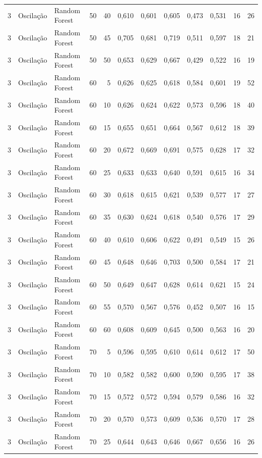 \begin{longtable}{@{}rllrrrrrrrrr@{}}
3 & Oscilação & Random Forest & 50 & 40 & 0,610 & 0,601 & 0,605 & 0,473 & 0,531 & 16 & 26 \\
3 & Oscilação & Random Forest & 50 & 45 & 0,705 & 0,681 & 0,719 & 0,511 & 0,597 & 18 & 21 \\
3 & Oscilação & Random Forest & 50 & 50 & 0,653 & 0,629 & 0,667 & 0,429 & 0,522 & 16 & 19 \\
3 & Oscilação & Random Forest & 60 & 5 & 0,626 & 0,625 & 0,618 & 0,584 & 0,601 & 19 & 52 \\
3 & Oscilação & Random Forest & 60 & 10 & 0,626 & 0,624 & 0,622 & 0,573 & 0,596 & 18 & 40 \\
3 & Oscilação & Random Forest & 60 & 15 & 0,655 & 0,651 & 0,664 & 0,567 & 0,612 & 18 & 39 \\
3 & Oscilação & Random Forest & 60 & 20 & 0,672 & 0,669 & 0,691 & 0,575 & 0,628 & 17 & 32 \\
3 & Oscilação & Random Forest & 60 & 25 & 0,633 & 0,633 & 0,640 & 0,591 & 0,615 & 16 & 34 \\
3 & Oscilação & Random Forest & 60 & 30 & 0,618 & 0,615 & 0,621 & 0,539 & 0,577 & 17 & 27 \\
3 & Oscilação & Random Forest & 60 & 35 & 0,630 & 0,624 & 0,618 & 0,540 & 0,576 & 17 & 29 \\
3 & Oscilação & Random Forest & 60 & 40 & 0,610 & 0,606 & 0,622 & 0,491 & 0,549 & 15 & 26 \\
3 & Oscilação & Random Forest & 60 & 45 & 0,648 & 0,646 & 0,703 & 0,500 & 0,584 & 17 & 21 \\
3 & Oscilação & Random Forest & 60 & 50 & 0,649 & 0,647 & 0,628 & 0,614 & 0,621 & 15 & 24 \\
3 & Oscilação & Random Forest & 60 & 55 & 0,570 & 0,567 & 0,576 & 0,452 & 0,507 & 16 & 15 \\
3 & Oscilação & Random Forest & 60 & 60 & 0,608 & 0,609 & 0,645 & 0,500 & 0,563 & 16 & 20 \\
3 & Oscilação & Random Forest & 70 & 5 & 0,596 & 0,595 & 0,610 & 0,614 & 0,612 & 17 & 50 \\
3 & Oscilação & Random Forest & 70 & 10 & 0,582 & 0,582 & 0,600 & 0,590 & 0,595 & 17 & 38 \\
3 & Oscilação & Random Forest & 70 & 15 & 0,572 & 0,572 & 0,594 & 0,579 & 0,586 & 16 & 32 \\
3 & Oscilação & Random Forest & 70 & 20 & 0,570 & 0,573 & 0,609 & 0,536 & 0,570 & 17 & 28 \\
3 & Oscilação & Random Forest & 70 & 25 & 0,644 & 0,643 & 0,646 & 0,667 & 0,656 & 16 & 26 \\

\end{longtable}
